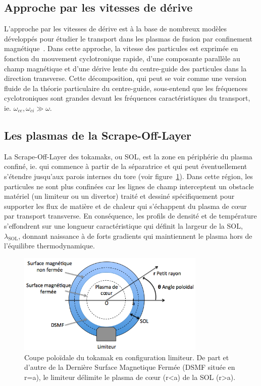 \begin{refsection}
\section{Approche par les vitesses de dérive}
\label{vitessesDerive}
L'approche par les vitesses de dérive est à la base de nombreux modèles
développés pour étudier le transport dans les plasmas de fusion par
confinement magnétique~\parencite{Garcia,Bisai,Tamain}. Dans cette approche, la
vitesse des particules est exprimée en fonction du mouvement cyclotronique rapide, d'une composante
parallèle au champ magnétique et d'une dérive lente du centre-guide des particules dans
la direction transverse. Cette décomposition, qui peut se voir comme une
version fluide de la théorie particulaire du centre-guide, sous-entend que les
fréquences cyclotroniques sont grandes devant les fréquences caractéristiques du
transport, ie. $\omega_{ce},\omega_{ci}\gg\omega$. 
 
\subsection{Les plasmas de la Scrape-Off-Layer}
La Scrape-Off-Layer des tokamaks, ou SOL, est la zone en
périphérie du plasma confiné, ie. qui commence à partir de la séparatrice et qui
peut éventuellement s'étendre jusqu'aux parois internes du tore (voir
figure~\ref{SOL}). Dans cette région, les
particules ne sont plus confinées car les lignes de champ interceptent un
obstacle matériel (un limiteur ou un divertor) traité et dessiné spécifiquement
pour supporter les flux de matière et de chaleur qui s'échappent du plasma de
c\oe ur par transport transverse.
En conséquence, les profils de densité et de température s'effondrent sur une
longueur caractéristique qui définit la largeur de la SOL, $\lambda_\text{SOL}$,
donnant naissance à de forts gradients qui maintiennent le plasma hors
de l'équilibre thermodynamique.

\begin{figure}[!htbp]
    \centering
	\includegraphics[width=0.8\textwidth]{figures/1-SOLLimiter.png}
	\caption{Coupe poloïdale du tokamak en configuration limiteur. De part et
	d'autre de la Dernière Surface Magnetique Fermée (DSMF située en r=a), le
	limiteur délimite le plasma de c\oe ur (r<a) de la SOL (r>a).}\label{SOL}
\end{figure}
 

\end{refsection}
